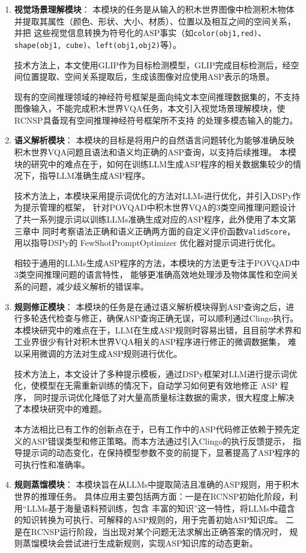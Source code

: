 \begin{enumerate}[nosep]
\item \textbf{视觉场景理解模块}：
本模块的任务是从输入的积木世界图像中检测积木物体并提取其属性（颜色、形状、大小、材质）、位置以及相互之间的空间关系，并把
这些视觉信息转换为符号化的ASP事实（如\texttt{color(obj1,red)}、\texttt{shape(obj1, cube)}、\texttt{left(obj1,obj2)}等）。

技术方法上，本文使用GLIP作为目标检测模型，GLIP完成目标检测后，经空间位置提取、空间关系提取后，生成该图像对应使用ASP表示的场景。

现有的空间推理领域的神经符号框架\cite{wang2024DSPy}是面向纯文本空间推理数据集的，不支持图像输入，不能完成积木世界VQA任务，本文引入视觉场景理解模块，使RCNSP具备现有空间推理神经符号框架所不支持
的处理多模态输入的能力。
\item \textbf{语义解析模块}：
本模块的目标是将用户的自然语言问题转化为能够准确反映积木世界VQA问题且语法和语义均正确的ASP查询，以支持后续推理。
本模块的研究中的难点在于，如何在训练LLM生成ASP程序的相关数据集较少的情况下，指导LLM准确生成ASP程序。

技术方法上，本模块采用提示词优化的方法对LLMs进行优化，并引入DSPy作为提示管理的框架，
针对POVQAD中积木世界VQA的3类空间推理问题设计了共一系列提示词以训练LLMs准确生成对应的ASP程序，此外使用了本文第三章中
同时考察语法正确和语义正确两方面的自定义评价函数\texttt{ValidScore}，用以指导DSPy的 FewShotPromptOptimizer 优化器对提示词进行优化。

相较于通用的LLMs生成ASP程序的方法，本模块的方法更专注于POVQAD中3类空间推理问题的语言特性，
能够更准确高效地处理涉及物体属性和空间关系的问题，减少歧义解析的错误率。
\item \textbf{规则修正模块}：
本模块的任务是在通过语义解析模块得到ASP查询之后，进行多轮迭代检查与修正，确保ASP查询正确无误，可以顺利通过Clingo执行。
本模块研究中的难点在于，LLM在生成ASP规则时容易出错，且目前学术界和工业界很少有针对积木世界VQA相关的ASP程序进行修正的微调数据集，
难以采用微调的方法对生成ASP规则进行优化。

技术方法上，本文设计了多种提示模板，通过DSPy框架对LLM进行提示词优化，使模型在无需重新训练的情况下，自动学习如何更有效地修正 ASP 程序，
同时提示词优化降低了对大量高质量标注数据的需求，很大程度上解决了本模块研究中的难题。

本方法相比已有工作的创新点在于，已有工作中的ASP代码修正依赖于预先定义的ASP错误类型和修正策略。而本方法通过引入Clingo的执行反馈提示，
指导提示词的动态变化，在保持模型参数不变的前提下，显著提高了ASP程序的可执行性和准确率。
\item \textbf{规则蒸馏模块}：
本模块旨在从LLMs中提取简洁且准确的ASP规则，用于积木世界的推理任务。
具体应用主要包括两方面：一是在RCNSP初始化阶段，利用“LLMs基于海量语料预训练，包含
丰富的知识”这一特性，将LLMs中蕴含的知识转换为可执行、可解释的ASP规则的，用于完善初始ASP知识库。
二是在RCNSP运行阶段，当出现对某个问题无法求解出正确答案的情况时，
规则蒸馏模块会尝试进行生成新规则，实现ASP知识库的动态更新。


\end{enumerate}
